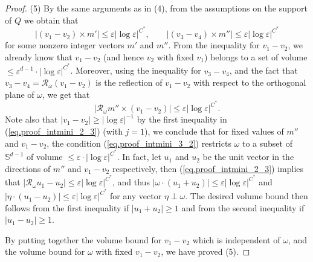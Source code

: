 \documentclass[10pt, reqno]{amsart}
\newcommand{\Sb}{\mathbb S}
\newcommand{\Rc}{\mathcal R}
\theoremstyle{definition}
\theoremstyle{remark}
\numberwithin{equation}{section}
\begin{document}
\begin{proof}
(5) By the same arguments as in (4), from the assumptions on the support of $Q$ we obtain that
\begin{equation}\label{eq.proof_intmini_3_1}
|(v_1-v_2)\times m'|\leq \varepsilon|\log\varepsilon|^{C^*},\qquad |(v_3-v_4)\times m''|\leq \varepsilon|\log\varepsilon|^{C^*}
\end{equation} for some nonzero integer vectors $m'$ and $m''$. From the inequality for $v_1-v_2$, we already know that $v_1-v_2$ (and hence $v_2$ with fixed $v_1$) belongs to a set of volume $\leq\varepsilon^{d-1}\cdot|\log\varepsilon|^{C^*}$. Moreover, using the inequality for $v_3-v_4$, and the fact that $v_3-v_4=\Rc_\omega(v_1-v_2)$ is the reflection of $v_1-v_2$ with respect to the orthogonal plane of $\omega$, we get that
\begin{equation}\label{eq.proof_intmini_3_2}
   |\Rc_\omega m''\times (v_1-v_2)|\le\varepsilon|\log\varepsilon|^{C^*}.
\end{equation} Note also that $|v_1-v_2|\geq |\log\varepsilon|^{-1}$ by the first inequality in (\ref{eq.proof_intmini_2_3}) (with $j=1$), we conclude that for fixed values of $m''$ and $v_1-v_2$, the condition (\ref{eq.proof_intmini_3_2}) restricts $\omega$ to a subset of $\Sb^{d-1}$ of volume $\leq\varepsilon\cdot|\log\varepsilon|^{C^*}$. In fact, let $u_1$ and $u_2$ be the unit vector in the directions of $m''$ and $v_1-v_2$ respectively, then (\ref{eq.proof_intmini_2_3}) implies that $|\Rc_\omega u_1-u_2|\leq \varepsilon|\log\varepsilon|^{C^*}$, and thus $|\omega\cdot (u_1+u_2)|\leq \varepsilon|\log\varepsilon|^{C^*}$ and $|\eta\cdot (u_1-u_2)|\leq \varepsilon|\log\varepsilon|^{C^*}$ for any vector $\eta\perp\omega$. The desired volume bound then follows from the first inequality if $|u_1+u_2|\geq 1$ and from the second inequality if $|u_1-u_2|\geq 1$.

By putting together the volume bound for $v_1-v_2$ which is independent of $\omega$, and the volume bound for $\omega$ with fixed $v_1-v_2$, we have proved (5).


\end{proof}
\end{document}
